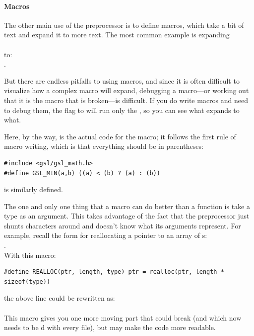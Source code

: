 \paragraph{Macros} \label{macros} 

The other main use of the preprocessor is to define macros, which take
a bit of text and expand it to more text. The most common example is
expanding\\
\\
to:\\
 .

But there are endless pitfalls to using macros, and since it is often
difficult to visualize how a complex macro will expand, debugging
a macro---or working out that it is the macro that is broken---is
difficult.  If you do write macros and need to debug them, the  flag to  will run only the , so you can
see what expands to what.

Here, by the way, is the actual code for the  macro;
it follows the first rule of macro writing, which is that everything
should be in parentheses:\\
\begin{lstlisting}
#include <gsl/gsl_math.h>
#define GSL_MIN(a,b) ((a) < (b) ? (a) : (b)) 
\end{lstlisting}
  is similarly defined.


The one and only one thing that a macro can do better than a function is
take a type as an argument. This takes advantage of the fact that the preprocessor 
just shunts characters around and doesn't know what its arguments represent.
For example, recall the form for reallocating a pointer to an array of s:\\
.\\
With this macro:
\begin{lstlisting}
#define REALLOC(ptr, length, type) ptr = realloc(ptr, length * sizeof(type))
\end{lstlisting}
the above line could be rewritten as:\\
\\
This macro gives you one more moving part that could break (and which
now needs to be d with every file), but
may make the code more readable.

